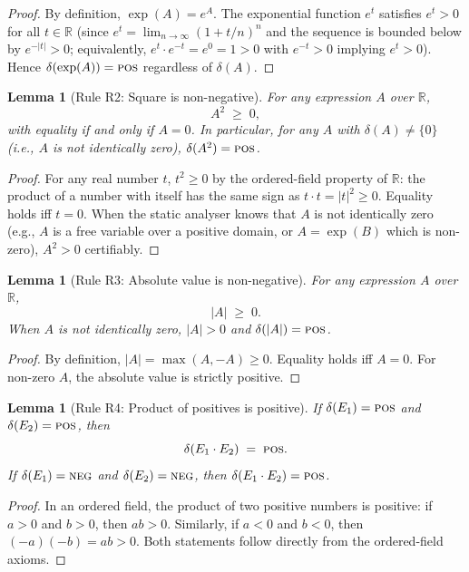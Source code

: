 \documentclass[12pt,a4paper]{article}
\newtheorem{lemma}[theorem]{Lemma}
\theoremstyle{definition}
\newcommand{\POS}{\textsc{pos}}
\newcommand{\NEG}{\textsc{neg}}
\begin{document}
\begin{proof}
By definition, $\exp(A) = e^{A}$.  The exponential function $e^t$ satisfies
$e^t > 0$ for all $t \in \mathbb{R}$ (since $e^t = \lim_{n\to\infty}(1+t/n)^n$
and the sequence is bounded below by $e^{-|t|} > 0$; equivalently, $e^t \cdot
e^{-t} = e^0 = 1 > 0$ with $e^{-t} > 0$ implying $e^t > 0$).
Hence $\delta(\exp(A)) = \POS$ regardless of $\delta(A)$.
\end{proof}

\begin{lemma}[Rule R2: Square is non-negative]
\label{lem:R2}
For any expression $A$ over $\mathbb{R}$,
\[
  A^2 \;\geq\; 0,
\]
with equality if and only if $A = 0$.  In particular, for any $A$ with
$\delta(A) \neq \{0\}$ (i.e., $A$ is not identically zero), $\delta(A^2) =
\POS$.
\end{lemma}

\begin{proof}
For any real number $t$, $t^2 \geq 0$ by the ordered-field property of
$\mathbb{R}$: the product of a number with itself has the same sign as $t \cdot t
= |t|^2 \geq 0$.  Equality holds iff $t = 0$.  When the static analyser knows
that $A$ is not identically zero (e.g., $A$ is a free variable over a positive
domain, or $A = \exp(B)$ which is non-zero), $A^2 > 0$ certifiably.
\end{proof}

\begin{lemma}[Rule R3: Absolute value is non-negative]
\label{lem:R3}
For any expression $A$ over $\mathbb{R}$,
\[
  |A| \;\geq\; 0.
\]
When $A$ is not identically zero, $|A| > 0$ and $\delta(|A|) = \POS$.
\end{lemma}

\begin{proof}
By definition, $|A| = \max(A, -A) \geq 0$.  Equality holds iff $A = 0$.
For non-zero $A$, the absolute value is strictly positive.
\end{proof}

\begin{lemma}[Rule R4: Product of positives is positive]
\label{lem:R4}
If $\delta(E_1) = \POS$ and $\delta(E_2) = \POS$, then
\[
  \delta(E_1 \cdot E_2) \;=\; \POS.
\]
If $\delta(E_1) = \NEG$ and $\delta(E_2) = \NEG$, then
$\delta(E_1 \cdot E_2) = \POS$.
\end{lemma}

\begin{proof}
In an ordered field, the product of two positive numbers is positive: if $a > 0$
and $b > 0$, then $ab > 0$.  Similarly, if $a < 0$ and $b < 0$, then
$(-a)(-b) = ab > 0$.  Both statements follow directly from the ordered-field
axioms.
\end{proof}
\end{document}
